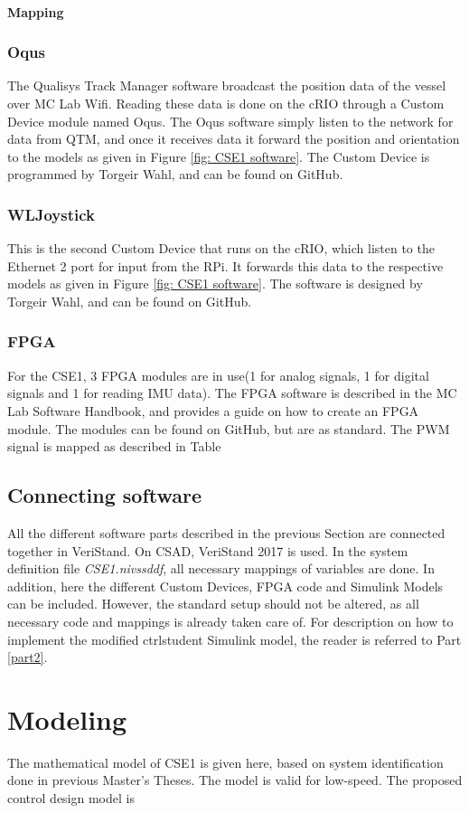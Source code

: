 \subsubsection{Mapping}

\subsection{Oqus}
The Qualisys Track Manager software broadcast the position data of the vessel over MC Lab Wifi. Reading these data is done on the cRIO through a Custom Device module named Oqus. The Oqus software simply listen to the network for data from QTM, and once it receives data it forward the position and orientation to the models as given in Figure \ref{fig: CSE1 software}. The Custom Device is programmed by Torgeir Wahl, and can be found on GitHub. 
\subsection{WL\textunderscore Joystick}
This is the second Custom Device that runs on the cRIO, which listen to the Ethernet 2 port for input from the RPi. It forwards this data to the respective models as given in Figure \ref{fig: CSE1 software}. The software is designed by Torgeir Wahl, and can be found on GitHub. 
\subsection{FPGA}
For the CSE1, 3 FPGA modules are in use(1 for analog signals, 1 for digital signals and 1 for reading IMU data). The FPGA software is described in the MC Lab Software Handbook, and provides a guide on how to create an FPGA module. The modules can be found on GitHub, but are as standard. The PWM signal is mapped as described in Table

\section{Connecting software}
All the different software parts described in the previous Section are connected together in VeriStand. On CSAD, VeriStand 2017 is used. In the system definition file \textit{CSE1.nivssddf}, all necessary mappings of variables are done. In addition, here the different Custom Devices, FPGA code and Simulink Models can be included. However, the standard setup should not be altered, as all necessary code and mappings is already taken care of. For description on how to implement the modified ctrl\textunderscore student Simulink model, the reader is referred to Part \ref{part2}. 
\chapter{Modeling}
The mathematical model of CSE1 is given here, based on system identification done in previous Master's Theses. The model is valid for low-speed. The proposed control design model is

